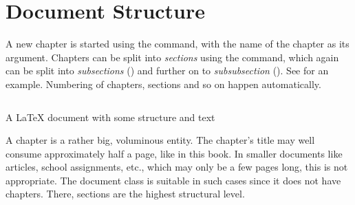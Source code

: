 {\section{Document Structure}
\index{\latexin{\chapter}}
\index{\latexin{\section}}
\index{\latexin{\subsection}}
\index{\latexin{\subsubsection}}
A new chapter is started using the \latexin{\chapter} command, with the name of the chapter as its argument. Chapters can be split into \emph{sections} using the \latexin{\section} command, which again can be split into \emph{subsections} (\latexin{\subsection}) and further on to \emph{subsubsection} (\latexin{\subsubsection}). See  for an example. Numbering of chapters, sections and so on happen automatically.

\begin{listing}[H]
	\inputminted[frame=lines,linenos]{latex}{latex/structure.tex}
	\caption{A \LaTeX{} document with some structure and text}
	\label{lst:latex:structure}
\end{listing}

A chapter is a rather big, voluminous entity. The chapter's title may well consume approximately half a page, like in this book. In smaller documents like articles, school assignments, etc., which may only be a few pages long, this is not appropriate. The   document class is suitable in such cases since it does not have chapters. There, sections are the highest structural level.

}

